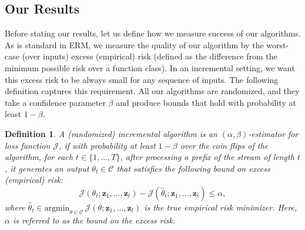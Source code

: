 \documentclass{article}
\theoremstyle{plain}
\newtheorem{definition}{Definition}
\def \z {\mathbf z}
\def \CCC {\mathcal{C}}
\def \JJJ {\mathcal{J}}
\begin{document}
\subsection{Our Results}
Before stating our results, let us define how we measure success of our algorithms. As is standard in ERM, we measure the quality of our algorithm by the worst-case (over inputs) excess (empirical) risk (defined as the difference from the minimum possible risk over a function class). In an incremental setting, we want this excess risk to be always small for any sequence of inputs. The following definition captures this requirement. All our algorithms are randomized, and they take a confidence parameter $\beta$ and produce bounds that hold with probability at least $1-\beta$. 
\begin{definition} \label{defn:utilerm}
A (randomized) incremental algorithm is an $(\alpha,\beta)$-{\em estimator} for loss function $\JJJ$, if with probability at least $1 -\beta$ over the coin flips of the algorithm, for each $t \in \{1,\dots,T\}$, after processing a prefix of the stream of length $t$, it generates an output $\theta_t \in \CCC$ that satisfies the following bound on excess (empirical) risk:
$$\JJJ(\theta_t;\z_1,\dots,\z_t)- \JJJ(\hat{\theta}_t;\z_1,\dots,\z_t) \leq \alpha,$$
where $\hat{\theta}_t \in \mbox{argmin}_{\theta \in \CCC}\, \JJJ(\theta;\z_1,\dots,\z_t)$ is the true empirical risk minimizer. Here, $\alpha$ is referred to as the bound on the excess risk.
\end{definition}
\end{document}

